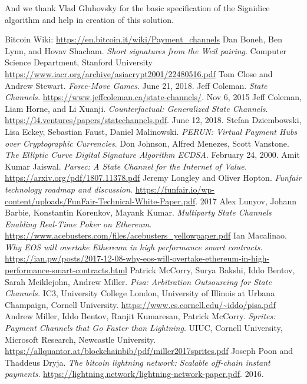 \documentclass[tikz, 12pt]{article}
\theoremstyle{definition}
\theoremstyle{remark}
\begin{document}
And we thank  Vlad Gluhovsky for the basic specification of the Signidice algorithm and help in creation of this solution.
	\begin{thebibliography}{9}
 Bitcoin Wiki: \url{https://en.bitcoin.it/wiki/Payment_channels}
 Dan Boneh, Ben Lynn, and Hovav Shacham. \emph{Short signatures from the Weil pairing}. Computer Science Department, Stanford University \url{https://www.iacr.org/archive/asiacrypt2001/22480516.pdf}
 Tom Close and Andrew Stewart. \emph{Force-Move Games}. June 21, 2018.
 Jeff Coleman. \emph{State Channels.} \url{https://www.jeffcoleman.ca/state-channels/}. Nov 6, 2015
 Jeff Coleman, Liam Horne, and Li Xuanji. \emph{Counterfactual: Generalized State Channels}. \url{https://l4.ventures/papers/statechannels.pdf}. June 12, 2018.
 Stefan Dziembowski, Lisa Eckey, Sebastian Faust, Daniel Malinowski. \emph{PERUN: Virtual Payment Hubs over Cryptographic Currencies}.
 Don Johnson, Alfred Menezes, Scott Vanstone. \emph{The Elliptic Curve Digital Signature Algorithm ECDSA}. February 24, 2000.
 Amit Kumar Jaiswal. \emph{Parsec: A State Channel for the Internet of Value.} \url{https://arxiv.org/pdf/1807.11378.pdf}
 Jeremy Longley and Oliver Hopton. \emph{Funfair technology roadmap and discussion}. \url{https://funfair.io/wp-content/uploads/FunFair-Technical-White-Paper.pdf}. 2017
 Alex Lunyov, Johann Barbie, Konstantin Korenkov, Mayank Kumar. \emph{Multiparty State Channels Enabling Real-Time Poker on Ethereum}. \url{https://www.acebusters.com/files/acebusters_yellowpaper.pdf}
 Ian Macalinao. \emph{Why EOS will overtake Ethereum in high performance smart contracts}. \url{https://ian.pw/posts/2017-12-08-why-eos-will-overtake-ethereum-in-high-performance-smart-contracts.html}
 Patrick McCorry, Surya Bakshi, Iddo Bentov, Sarah Meiklejohn, Andrew Miller. \emph{Pisa: Arbitration Outsourcing for State Channels.} IC3, University College London, University of Illinois at Urbana Champaign, Cornell University. \url{https://www.cs.cornell.edu/~iddo/pisa.pdf}
 Andrew Miller, Iddo Bentov, Ranjit Kumaresan, Patrick McCorry. \emph{Sprites: Payment Channels that Go Faster than Lightning}. UIUC, Cornell University, Microsoft Research, Newcastle University. \url{https://allquantor.at/blockchainbib/pdf/miller2017sprites.pdf}
 Joseph Poon and Thaddeus Dryja. \emph{The bitcoin lightning network: Scalable off-chain instant payments}. \url{https://lightning.network/lightning-network-paper.pdf}. 2016.

\end{thebibliography}
\end{document}
